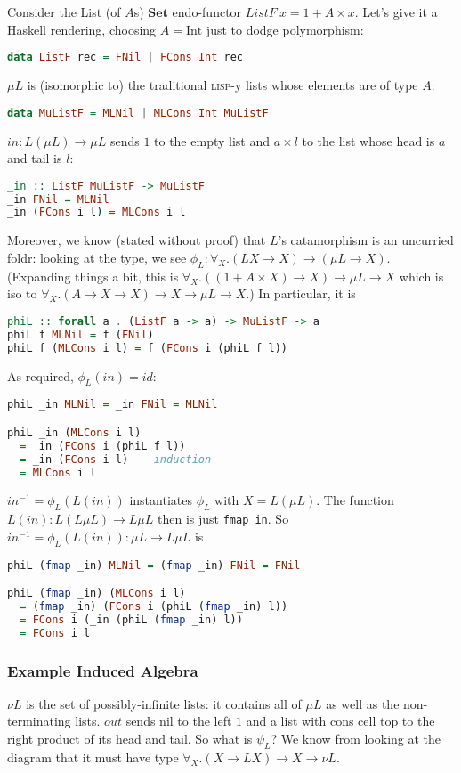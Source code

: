 \documentclass[letterpaper]{article}
\begin{document}
Consider the List (of $A$s) $\mathbf{Set}$ endo-functor $ListF~x = 1 + A \times
x$.  Let's give it a Haskell rendering, choosing $A = \text{Int}$ just to
dodge polymorphism:
%
\begin{lstlisting}[language=Haskell]
data ListF rec = FNil | FCons Int rec
\end{lstlisting}
%
$\mu L$ is (isomorphic to) the traditional \textsc{lisp}-y lists whose
elements are of type $A$:
%
\begin{lstlisting}[language=Haskell]
data MuListF = MLNil | MLCons Int MuListF
\end{lstlisting}
%
$in : L (\mu L) \to \mu L$ sends $1$ to the empty
list and $a \times l$ to the list whose head is $a$ and tail is $l$:
%
\begin{lstlisting}[language=Haskell]
_in :: ListF MuListF -> MuListF
_in FNil = MLNil
_in (FCons i l) = MLCons i l
\end{lstlisting}
%
Moreover, we know (stated without proof) that $L$'s catamorphism is an
uncurried foldr: looking at the type, we see $\phi_L : \forall_X . (L X \to
X) \to (\mu L \to X)$.  (Expanding things a bit, this is $\forall_X . ((1 +
A \times X) \to X) \to \mu L \to X$ which is iso to $\forall_X . (A \to X
\to X) \to X \to \mu L \to X$.)  In particular, it is
%
\begin{lstlisting}[language=Haskell]
phiL :: forall a . (ListF a -> a) -> MuListF -> a
phiL f MLNil = f (FNil)
phiL f (MLCons i l) = f (FCons i (phiL f l))
\end{lstlisting}
%
As required, $\phi_L(in) = id$:
%
\begin{lstlisting}[language=Haskell]
phiL _in MLNil = _in FNil = MLNil

phiL _in (MLCons i l)
  = _in (FCons i (phiL f l))
  = _in (FCons i l)	-- induction
  = MLCons i l
\end{lstlisting}
%
$in^{-1} = \phi_L(L(in))$ instantiates $\phi_L$ with $X = L (\mu L)$.  The
function $L(in) : L (L \mu L) \to L \mu L$ then is just \texttt{fmap in}.
So $in^{-1} = \phi_L(L(in)) : \mu L \to L \mu L$ is
\begin{lstlisting}[language=Haskell]
phiL (fmap _in) MLNil = (fmap _in) FNil = FNil

phiL (fmap _in) (MLCons i l)
  = (fmap _in) (FCons i (phiL (fmap _in) l))
  = FCons i (_in (phiL (fmap _in) l))
  = FCons i l
\end{lstlisting}

\subsubsection{Example Induced Algebra}

$\nu L$ is the set of possibly-infinite lists: it contains all of $\mu L$ as
well as the non-terminating lists.  $out$ sends nil to the left $1$ and a
list with cons cell top to the right product of its head and tail.  So what
is $\psi_L$?  We know from looking at the diagram that it must have type
$\forall_X . (X \to L X) \to X \to \nu L$.
\end{document}
